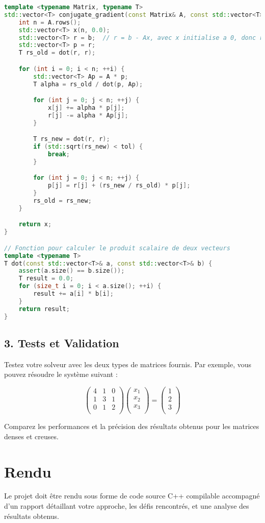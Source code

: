 \documentclass[a4paper,14pt]{article}
\begin{document}
\begin{lstlisting}[language=C++]
template <typename Matrix, typename T>
std::vector<T> conjugate_gradient(const Matrix& A, const std::vector<T>& b, T tol = 1e-10) {
    int n = A.rows();
    std::vector<T> x(n, 0.0);
    std::vector<T> r = b;  // r = b - Ax, avec x initialise a 0, donc r = b
    std::vector<T> p = r;
    T rs_old = dot(r, r);

    for (int i = 0; i < n; ++i) {
        std::vector<T> Ap = A * p;
        T alpha = rs_old / dot(p, Ap);

        for (int j = 0; j < n; ++j) {
            x[j] += alpha * p[j];
            r[j] -= alpha * Ap[j];
        }

        T rs_new = dot(r, r);
        if (std::sqrt(rs_new) < tol) {
            break;
        }

        for (int j = 0; j < n; ++j) {
            p[j] = r[j] + (rs_new / rs_old) * p[j];
        }
        rs_old = rs_new;
    }

    return x;
}

// Fonction pour calculer le produit scalaire de deux vecteurs
template <typename T>
T dot(const std::vector<T>& a, const std::vector<T>& b) {
    assert(a.size() == b.size());
    T result = 0.0;
    for (size_t i = 0; i < a.size(); ++i) {
        result += a[i] * b[i];
    }
    return result;
}
\end{lstlisting}

\subsection*{3. Tests et Validation}

Testez votre solveur avec les deux types de matrices fournis. Par exemple, vous pouvez résoudre le système suivant :

\[
\begin{pmatrix}
4 & 1 & 0 \\
1 & 3 & 1 \\
0 & 1 & 2 \\
\end{pmatrix}
\begin{pmatrix}
x_1 \\
x_2 \\
x_3 \\
\end{pmatrix}
=
\begin{pmatrix}
1 \\
2 \\
3 \\
\end{pmatrix}
\]

Comparez les performances et la précision des résultats obtenus pour les matrices denses et creuses.

\section*{Rendu}

Le projet doit être rendu sous forme de code source C++ compilable accompagné d'un rapport détaillant votre approche, les défis rencontrés, et une analyse des résultats obtenus.
\end{document}
